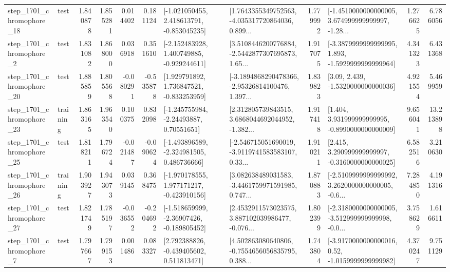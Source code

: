 \begin{tabular}{llrrrrllrlrr}
 step\_1701\_chromophore\_18 &      test &      1.840878 &    1.855281 &      0.014402 &  0.181124 &   [-1.021050455, 2.418613791, -0.853045235] &  [1.7643355349752563, -4.035317720864036, 0.899... &       1.779992 &  [-1.4510000000000005, 3.674999999999997, -1.28... &            1.276625 &          6.786056 \\
  step\_1701\_chromophore\_2 &      test &      1.831082 &    1.868000 &      0.036918 &  0.351610 &   [-2.152483928, 1.400749885, -0.929244611] &  [3.5108446200776884, -2.5442877307695873, 1.65... &       1.917075 &  [-3.3879999999999995, 1.893, -1.5929999999999964] &            4.341323 &          6.431368 \\
 step\_1701\_chromophore\_20 &      test &      1.885859 &    1.805568 &     -0.080291 & -0.535878 &    [1.929791892, 1.736847521, -0.833253959] &  [-3.1894868290478366, -2.95326814100476, 1.397... &       1.839823 &                 [3.09, 2.439, -1.5320000000000036] &            4.921554 &          5.469959 \\
 step\_1701\_chromophore\_23 &  training &      1.863165 &    1.963540 &      0.100375 &  0.832098 &     [-1.245755984, -2.24493887, 0.70551651] &  [2.312805739843515, 3.6868044692044952, -1.382... &       1.917418 &    [1.404, 3.931999999999995, -0.8990000000000009] &            9.656041 &         13.213898 \\
 step\_1701\_chromophore\_25 &      test &      1.818211 &    1.796724 &     -0.021487 & -0.090624 &   [-1.493896589, -2.324981505, 0.486736666] &  [-2.546715051690019, -3.9119741583583107, 0.33... &       1.910211 &    [2.415, 3.290999999999997, -0.3160000000000025] &            6.582516 &          3.210630 \\
 step\_1701\_chromophore\_26 &  training &      1.903927 &    1.943073 &      0.039145 &  0.368475 &   [-1.970178555, 1.977171217, -0.423910156] &  [3.082638489031583, -3.4461759971591985, 0.747... &       1.870883 &  [-2.5109999999999992, 3.2620000000000005, -0.6... &            7.284850 &          4.191316 \\
 step\_1701\_chromophore\_27 &      test &      1.821749 &    1.785197 &     -0.036552 & -0.204692 &   [-1.518659999, -2.36907426, -0.189805452] &  [2.4532911573023575, 3.887102039986477, -0.076... &       1.802399 &  [-2.3180000000000005, -3.512999999999998, -0.0... &            3.758629 &          1.616611 \\
  step\_1701\_chromophore\_7 &      test &      1.797667 &    1.799153 &      0.001486 &  0.083327 &    [2.792388826, -0.439405602, 0.511813471] &  [4.502863080640806, -0.7554656056835795, 0.388... &       1.743804 &   [-3.9170000000000016, 0.52, -1.0159999999999982] &            4.370247 &          9.751129 \\

\end{tabular}
